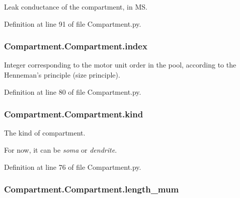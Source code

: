 Leak conductance of the compartment, in M\-S. 



Definition at line 91 of file Compartment.\-py.

\hypertarget{class_compartment_1_1_compartment_a9402ef46ede52521ebbb9e9d2d68d631}{
\subsubsection[{index}]{\setlength{\rightskip}{0pt plus 5cm}Compartment.\-Compartment.\-index}}\label{class_compartment_1_1_compartment_a9402ef46ede52521ebbb9e9d2d68d631}


Integer corresponding to the motor unit order in the pool, according to the Henneman's principle (size principle). 



Definition at line 80 of file Compartment.\-py.

\hypertarget{class_compartment_1_1_compartment_a74f2266a2231c4a81cc680bc201f0ffd}{
\subsubsection[{kind}]{\setlength{\rightskip}{0pt plus 5cm}Compartment.\-Compartment.\-kind}}\label{class_compartment_1_1_compartment_a74f2266a2231c4a81cc680bc201f0ffd}


The kind of compartment. 

For now, it can be {\itshape soma} or {\itshape dendrite}. 

Definition at line 76 of file Compartment.\-py.

\hypertarget{class_compartment_1_1_compartment_a8154742b0082eea301690e3566e477b6}{
\subsubsection[{length\-\_\-mum}]{\setlength{\rightskip}{0pt plus 5cm}Compartment.\-Compartment.\-length\-\_\-mum}}\label{class_compartment_1_1_compartment_a8154742b0082eea301690e3566e477b6}


